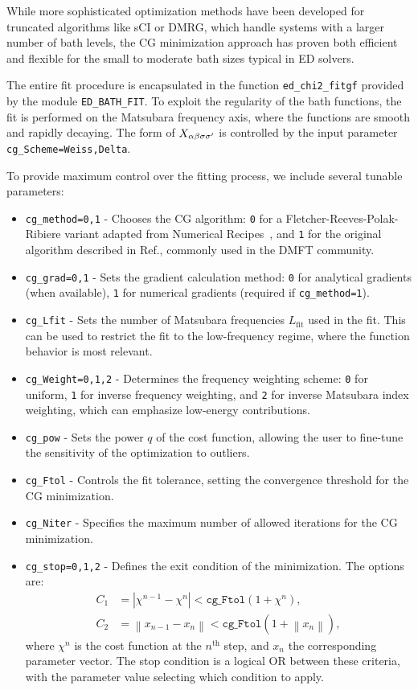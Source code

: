 \documentclass[edipack2.tex]{subfiles}
\begin{document}
While more sophisticated optimization methods have been developed for 
truncated algorithms like sCI\cite{Mejuto_Bath_ASCI-DMFT} or DMRG\cite{boh}, 
which handle systems with a 
larger number of bath levels, the CG minimization approach has proven 
both efficient and flexible for the small to moderate bath sizes 
typical in ED solvers. 

The entire fit procedure is encapsulated in the function 
\texttt{ed\_chi2\_fitgf} provided by the module 
\texttt{ED\_BATH\_FIT}. To exploit the regularity of the bath functions, 
the fit is performed on the Matsubara frequency axis, where the functions 
are smooth and rapidly decaying. The form of $X_{\alpha\beta\sigma\sigma'}$ is controlled 
by the input parameter \texttt{cg\_Scheme=Weiss,Delta}.

To provide maximum control over the fitting process, we include several 
tunable parameters:
\begin{itemize}
\item \texttt{cg\_method=0,1} - Chooses the CG algorithm: 
\texttt{0} for a Fletcher-Reeves-Polak-Ribiere variant adapted from 
Numerical Recipes~\cite{NumRec77}, and \texttt{1} for the original 
algorithm described in Ref., commonly used 
in the DMFT community.
\item \texttt{cg\_grad=0,1} - Sets the gradient calculation method: 
\texttt{0} for analytical gradients (when available), \texttt{1} for 
numerical gradients (required if \texttt{cg\_method=1}).
\item \texttt{cg\_Lfit} - Sets the number of Matsubara frequencies 
$L_\mathrm{fit}$ used in the fit. This can be used to restrict the 
fit to the low-frequency regime, where the function behavior is 
most relevant.
\item \texttt{cg\_Weight=0,1,2} - Determines the frequency weighting 
scheme: \texttt{0} for uniform, \texttt{1} for inverse frequency 
weighting, and \texttt{2} for inverse Matsubara index weighting, which 
can emphasize low-energy contributions.
\item \texttt{cg\_pow} - Sets the power $q$ of the cost function, 
allowing the user to fine-tune the sensitivity of the optimization 
to outliers.
\item \texttt{cg\_Ftol} - Controls the fit tolerance, setting the 
convergence threshold for the CG minimization.
\item \texttt{cg\_Niter} - Specifies the maximum number of allowed 
iterations for the CG minimization.
\item \texttt{cg\_stop=0,1,2} - Defines the exit condition of the 
minimization. The options are:
\begin{align*}
C_1 & = |\chi^{n-1} - \chi^n| < \mathtt{cg\_Ftol} (1+\chi^n), \\
C_2 & = \left\|x_{n-1} - x_n\right\| < 
\mathtt{cg\_Ftol} (1+\left\|x_n\right\|),
\end{align*}
where $\chi^n$ is the cost function at the $n^\mathrm{th}$ step, and 
$x_n$ the corresponding parameter vector. The stop condition is a 
logical OR between these criteria, with the parameter value selecting 
which condition to apply.
\end{itemize}
\end{document}
